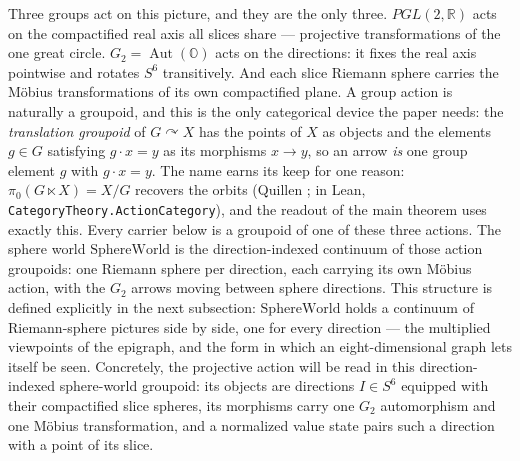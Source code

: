\documentclass[11pt]{article}
\newcommand{\OO}{\mathbb{O}}
\newcommand{\RR}{\mathbb{R}}
\DeclareMathOperator{\Aut}{Aut}
\providecommand{\SphereWorld}{\mathrm{SphereWorld}}
\theoremstyle{plain}
\theoremstyle{definition}
\theoremstyle{remark}
\begin{document}
Three groups act on this picture, and they are the only three. $PGL(2,\RR)$ acts on the
compactified real axis all slices share --- projective transformations of the one great
circle. $G_2=\Aut(\OO)$ acts on the directions: it fixes the real axis pointwise and rotates
$S^6$ transitively. And each slice Riemann sphere carries the M\"obius transformations of its
own compactified plane. A group action is naturally a groupoid, and this is the only
categorical device the paper needs: the \emph{translation groupoid} of $G\curvearrowright X$
has the points of $X$ as objects and the elements $g\in G$ satisfying $g\cdot x=y$ as its
morphisms $x\to y$, so an arrow \emph{is} one group element $g$ with
$g\cdot x=y$. The name earns its keep for one reason:
$\pi_0(G\ltimes X)=X/G$ recovers the orbits (Quillen \cite[\S1]{Quillen73}; in Lean,
\texttt{CategoryTheory.ActionCategory}), and the readout of the main
theorem uses exactly this. Every carrier below is a groupoid of one
of these three actions.  The sphere world $\SphereWorld$ is the
direction-indexed continuum of those action groupoids: one Riemann sphere
per direction, each carrying its own M\"obius action, with the $G_2$ arrows
moving between sphere directions. This structure is defined explicitly in the next
subsection: $\SphereWorld$ holds a continuum of Riemann-sphere pictures side
by side, one for every direction --- the multiplied viewpoints of the epigraph,
and the form in which an eight-dimensional graph lets itself be seen. Concretely, the
projective action will be read in this direction-indexed sphere-world groupoid: its objects
are directions $I\in S^6$ equipped with their compactified slice spheres, its morphisms carry
one $G_2$ automorphism and one M\"obius transformation, and a normalized value state pairs such a direction with a
point of its slice.
\end{document}
